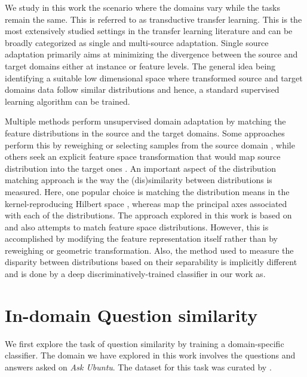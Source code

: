 \documentclass{sigkddExp}
\begin{document}
We study in this work the scenario where the domains vary while the tasks remain the same. This is referred to as transductive transfer learning. This is the most extensively studied settings in the transfer learning literature and can be broadly categorized as single and multi-source adaptation. Single source adaptation\cite{chen2009extracting, ando2005framework, daume2009frustratingly} primarily aims at minimizing the divergence between the source and target domains either at instance or feature levels. The general idea being identifying a suitable low dimensional space where transformed source and target domains data follow similar distributions and hence, a standard supervised learning algorithm can be trained.

Multiple methods perform unsupervised domain adaptation by matching the feature distributions in the source and the target domains. Some approaches perform this by reweighing or selecting samples from the source domain  \cite{borgwardt2006integrating, huang2007correcting, gong2012geodesic}, while others seek an explicit feature space transformation that would map source distribution into the target ones \cite{pan2011domain, gopalan2011domain, baktashmotlagh2013unsupervised}. An important  aspect of the distribution matching approach is the way the (dis)similarity between distributions is measured. Here, one popular choice is matching the distribution means in the kernel-reproducing Hilbert space \cite{borgwardt2006integrating, huang2007correcting}, whereas \cite{gong2012geodesic, fernando2013unsupervised} map the principal axes associated with each of the distributions. The approach explored in this work is based on \cite{ganin2015unsupervised} and also attempts to match feature space distributions. However, this is accomplished by modifying the feature representation itself rather than by reweighing or geometric transformation. Also, the method used to measure the disparity between distributions based on their separability is implicitly different and is done by a deep discriminatively-trained classifier in our work as.


\section{In-domain Question similarity}
\label{in_domain}
We first explore the task of question similarity by training a domain-specific classifier. The domain we have explored in this work involves the questions and answers asked on \textit{Ask Ubuntu}. The dataset for this task was curated by \cite{lei2015semi}. 
\end{document}
